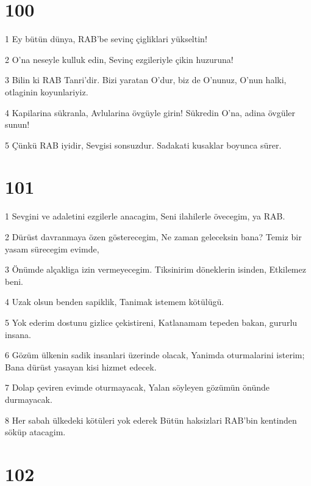 \chapter{100}

\par 1 Ey bütün dünya, RAB'be sevinç çigliklari yükseltin!
\par 2 O'na neseyle kulluk edin, Sevinç ezgileriyle çikin huzuruna!
\par 3 Bilin ki RAB Tanri'dir. Bizi yaratan O'dur, biz de O'nunuz, O'nun halki, otlaginin koyunlariyiz.
\par 4 Kapilarina sükranla, Avlularina övgüyle girin! Sükredin O'na, adina övgüler sunun!
\par 5 Çünkü RAB iyidir, Sevgisi sonsuzdur. Sadakati kusaklar boyunca sürer.

\chapter{101}

\par 1 Sevgini ve adaletini ezgilerle anacagim, Seni ilahilerle övecegim, ya RAB.
\par 2 Dürüst davranmaya özen gösterecegim, Ne zaman geleceksin bana? Temiz bir yasam sürecegim evimde,
\par 3 Önümde alçakliga izin vermeyecegim. Tiksinirim döneklerin isinden, Etkilemez beni.
\par 4 Uzak olsun benden sapiklik, Tanimak istemem kötülügü.
\par 5 Yok ederim dostunu gizlice çekistireni, Katlanamam tepeden bakan, gururlu insana.
\par 6 Gözüm ülkenin sadik insanlari üzerinde olacak, Yanimda oturmalarini isterim; Bana dürüst yasayan kisi hizmet edecek.
\par 7 Dolap çeviren evimde oturmayacak, Yalan söyleyen gözümün önünde durmayacak.
\par 8 Her sabah ülkedeki kötüleri yok ederek Bütün haksizlari RAB'bin kentinden söküp atacagim.

\chapter{102}

